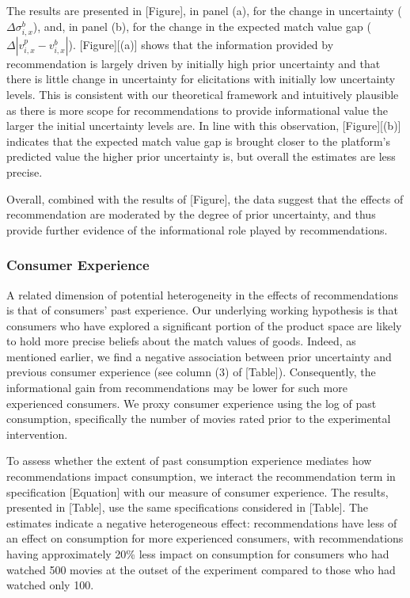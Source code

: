 \documentclass[12pt]{article}
\theoremstyle{newtheorem}
\begin{document}
The results are presented in [Figure], in panel (a), for the change in uncertainty ($\Delta \sigma_{i,x}^b$), and, in panel (b), for the change in the expected match value gap ($\Delta |v_{i,x}^p-v_{i,x}^b|$).
[Figure][(a)] shows that the information provided by recommendation is largely driven by initially high prior uncertainty and that there is little change in uncertainty for elicitations with initially low uncertainty levels. 
This is consistent with our theoretical framework and intuitively plausible as there is more scope for recommendations to provide informational value the larger the initial uncertainty levels are. 
In line with this observation, [Figure][(b)] indicates that the expected match value gap is brought closer to the platform's predicted value the higher prior uncertainty is, but overall the estimates are less precise.


Overall, combined with the results of [Figure], the data suggest that the effects of recommendation are moderated by the degree of prior uncertainty, and thus provide further evidence of the informational role played by recommendations.



\subsubsection{Consumer Experience}
A related dimension of potential heterogeneity in the effects of recommendations is that of consumers' past experience. 
Our underlying working hypothesis is that consumers who have explored a significant portion of the product space are likely to hold more precise beliefs about the match values of goods. 
Indeed, as mentioned earlier, we find a negative association between prior uncertainty and previous consumer experience (see column (3) of [Table]). 
Consequently, the informational gain from recommendations may be lower for such more experienced consumers. 
We proxy consumer experience using the log of past consumption, specifically the number of movies rated prior to the experimental intervention.


To assess whether the extent of past consumption experience mediates how recommendations impact consumption, we interact the recommendation term in specification [Equation] with our measure of consumer experience. 
The results, presented in [Table], use the same specifications considered in [Table]. 
The estimates indicate a negative heterogeneous effect: recommendations have less of an effect on consumption for more experienced consumers, with recommendations having approximately 20\% less impact on consumption for consumers who had watched 500 movies at the outset of the experiment compared to those who had watched only 100.
\end{document}
